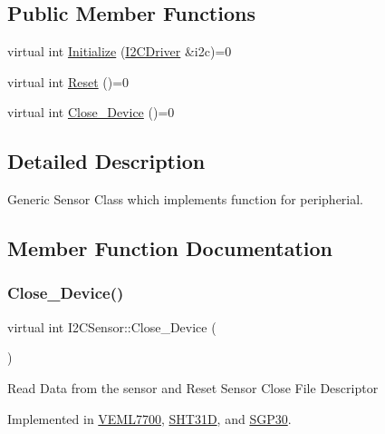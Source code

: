 \subsection*{Public Member Functions}
\begin{DoxyCompactItemize}
\item 
virtual int \hyperlink{classI2CSensor_a0fb4755ddff3fe2cf5a9651d9d1fe5cd}{Initialize} (\hyperlink{classI2CDriver}{I2\+C\+Driver} \&i2c)=0
\item 
virtual int \hyperlink{classI2CSensor_a0622266d335944782d2bfa6352f01095}{Reset} ()=0
\item 
virtual int \hyperlink{classI2CSensor_acee1633439e97bae412441ac085fabba}{Close\+\_\+\+Device} ()=0
\end{DoxyCompactItemize}


\subsection{Detailed Description}
Generic Sensor Class which implements function for peripherial. 

\subsection{Member Function Documentation}
\mbox{\label{classI2CSensor_acee1633439e97bae412441ac085fabba}} 
\subsubsection{\texorpdfstring{Close\+\_\+\+Device()}{Close\_Device()}}
{\footnotesize\ttfamily virtual int I2\+C\+Sensor\+::\+Close\+\_\+\+Device (\begin{DoxyParamCaption}{ }\end{DoxyParamCaption})\hspace{0.3cm}{\ttfamily [pure virtual]}}

Read Data from the sensor and Reset Sensor Close File Descriptor 

Implemented in \hyperlink{classVEML7700_af4be747d3c60af76ca46c7e4fb859ec7}{V\+E\+M\+L7700}, \hyperlink{classSHT31D_a925cd964b0a6535d40dff588ac7d02be}{S\+H\+T31D}, and \hyperlink{classSGP30_a3feaf2623eb853169d14687e7ad1db24}{S\+G\+P30}.

\mbox{\label{classI2CSensor_a0fb4755ddff3fe2cf5a9651d9d1fe5cd}} 

